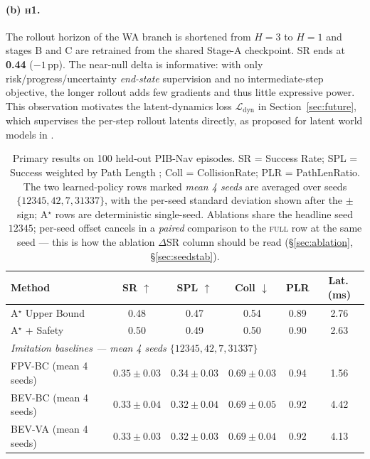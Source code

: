 \documentclass[11pt,a4paper]{article}
\begin{document}
\paragraph{(b) \textsc{h1}.} The rollout horizon of the WA branch is
shortened from $H{=}3$ to $H{=}1$ and stages B and C are retrained
from the shared Stage-A checkpoint. SR ends at \textbf{0.44}
($-1$\,pp). The near-null delta is informative: with only
risk/progress/uncertainty \emph{end-state} supervision and no
intermediate-step objective, the longer rollout adds few gradients and
thus little expressive power. This observation motivates the
latent-dynamics loss $\mathcal{L}_{\text{dyn}}$ in
Section~\ref{sec:future}, which supervises the per-step rollout
latents directly, as proposed for latent world models in
\citep{HaSchmidhuber2018,DreamerV3}.

\begin{table}[t]
\centering
\small
\caption{Primary results on 100 held-out PIB-Nav episodes. SR =
         Success Rate; SPL = Success weighted by Path Length
         \citep{AndersonOnEvaluation2018}; Coll = CollisionRate; PLR =
         PathLenRatio. The two learned-policy rows marked \emph{mean
         4 seeds} are averaged over seeds $\{12345,42,7,31337\}$,
         with the per-seed standard deviation shown after the $\pm$
         sign; A$^\star$ rows are deterministic single-seed. Ablations
         share the headline seed $12345$; per-seed offset cancels in a
         \emph{paired} comparison to the \textsc{full} row at the same
         seed --- this is how the ablation $\Delta$SR column should be
         read (\S\ref{sec:ablation}, \S\ref{sec:seedstab}).}
\label{tab:milestones}
\begin{tabular}{lccccc}
\toprule
Method & SR $\uparrow$ & SPL $\uparrow$ & Coll $\downarrow$ & PLR & Lat.\,(ms) \\
\midrule
A$^\star$ Upper Bound                   & 0.48 & 0.47 & 0.54 & 0.89 & 2.76 \\
A$^\star$ + Safety                      & 0.50 & 0.49 & 0.50 & 0.90 & 2.63 \\
\midrule
\multicolumn{6}{l}{\emph{Imitation baselines --- mean 4 seeds $\{12345,42,7,31337\}$}} \\
FPV-BC (mean 4 seeds)                   & $0.35\pm 0.03$ & $0.34\pm 0.03$ & $0.69\pm 0.03$ & 0.94 & 1.56 \\
BEV-BC (mean 4 seeds)                   & $0.33\pm 0.04$ & $0.32\pm 0.04$ & $0.69\pm 0.05$ & 0.92 & 4.42 \\
BEV-VA (mean 4 seeds)                   & $0.33\pm 0.03$ & $0.32\pm 0.03$ & $0.69\pm 0.04$ & 0.92 & 4.13 \\

\end{tabular}
\end{table}
\end{document}
